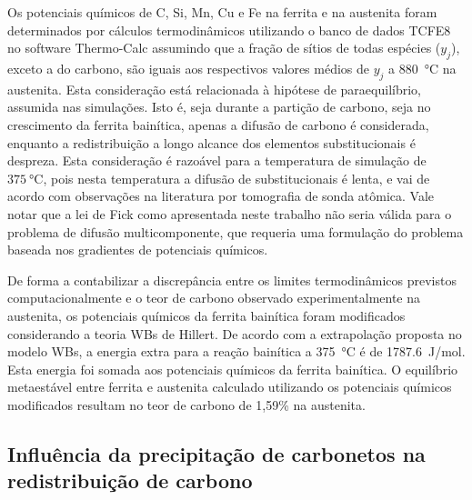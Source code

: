 Os potenciais químicos de C, Si, Mn, Cu e Fe na ferrita e na austenita foram determinados por cálculos termodinâmicos utilizando o banco de dados TCFE8 no software Thermo-Calc\textregistered{} assumindo que a fração de sítios de todas espécies ($y_j$), exceto a do carbono, são iguais aos respectivos valores médios de $y_j$ a \SI{880}{\degreeCelsius} na austenita. Esta consideração está relacionada à hipótese de paraequilíbrio, assumida nas simulações. Isto é, seja durante a partição de carbono, seja no crescimento da ferrita bainítica, apenas a difusão de carbono é considerada, enquanto a redistribuição a longo alcance dos elementos substitucionais é despreza. Esta consideração é razoável para a temperatura de simulação de $\SI{375}{\degreeCelsius}$, pois nesta temperatura a difusão de substitucionais é lenta, e vai de acordo com observações na literatura por tomografia de sonda atômica. %
Vale notar que a lei de Fick como apresentada neste trabalho não seria válida para o problema de difusão multicomponente, que requeria uma formulação do problema baseada nos gradientes de potenciais químicos.

De forma a contabilizar a discrepância entre os limites termodinâmicos previstos computacionalmente e o teor de carbono observado experimentalmente na austenita, os potenciais químicos da ferrita bainítica foram modificados considerando a teoria WBs de Hillert. De acordo com a extrapolação proposta no modelo WBs, a energia extra para a reação bainítica a \SI{375}{\degreeCelsius} é de \SI{1787.6}{J/mol}. Esta energia foi somada aos potenciais químicos da ferrita bainítica. O equilíbrio metaestável entre ferrita e austenita calculado utilizando os potenciais químicos modificados resultam no teor de carbono de 1,59\% na austenita. 

\subsection{Influência da precipitação de carbonetos na redistribuição de carbono}

\label{sec:cpartition_sem_bainita}

